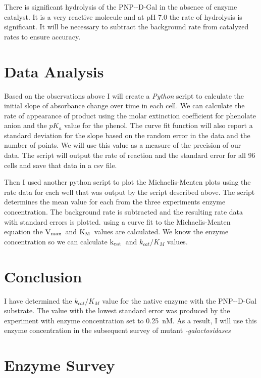 \documentclass[]{tufte-handout}
\newcommand{\Km}{$\rm K_M$}
\newcommand{\Vmax}{$\rm V_{max}$}
\newcommand{\kcat}{$\rm k_{cat}$}
\begin{document}
There is significant hydrolysis of the PNP-\textbeta-D-Gal in the absence of enzyme catalyst.  It is a very reactive molecule and at pH 7.0 the rate of hydrolysis is significant. It will be necessary to subtract the background rate from catalyzed rates to ensure accuracy.

\section{Data Analysis}

Based on the observations above I will create a \emph{Python} script to calculate the initial slope of absorbance change over time in each cell. We can calculate the rate of appearance of product using the molar extinction coefficient for phenolate anion and the $pK_a$ value for the phenol. The curve fit function will also report a standard deviation for the slope based on the random error in the data and the number of points. We will use this value as a measure of the precision of our data. The script will output the rate of reaction and the standard error for all 96 cells and save that data in a csv file. 

Then I used another python script to plot the Michaelis-Menten plots using the rate data for each well that was output by the script described above. The script determines the mean value for each from the three exper\-i\-ments enzyme concentration. The background rate is subtracted and the resulting rate data with standard errors is plotted. using a curve fit to the Michaelis-Menten equation the \Vmax\ and \Km\ values are calculated. We know the enzyme concentration so we can calculate \kcat\ and $k_{cat}/K_M$ values.

\section{Conclusion}

I have determined the $k_{cat}/K_M$ value for the native enzyme with the PNP-\textbeta-D-Gal substrate. The value with the lowest standard error was produced by the experiment with enzyme concentration set to \qty{0.25}{nM}. As a result, I will use this enzyme concentration in the subsequent survey of mutant \emph{\textbeta -galactosidases}

\section{Enzyme Survey} 
\end{document}
